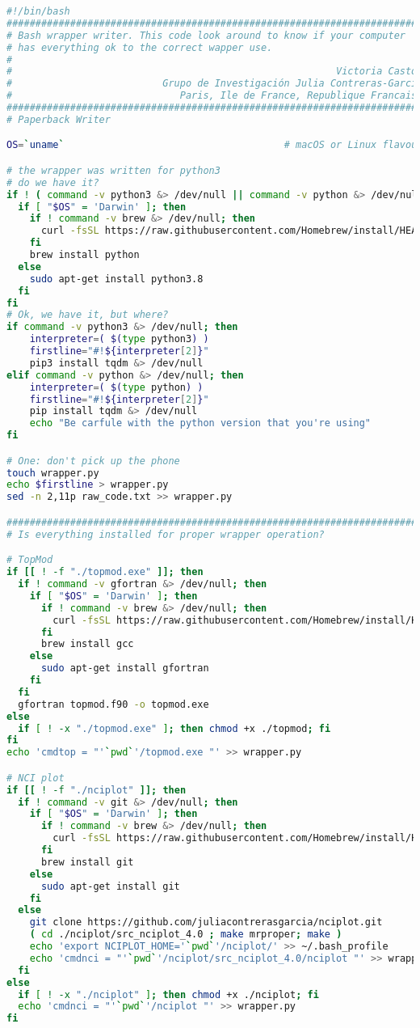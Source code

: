 \begin{lstlisting}[language=bash]
#!/bin/bash
########################################################################
# Bash wrapper writer. This code look around to know if your computer
# has everything ok to the correct wapper use.
#
#                                                        Victoria Castor
#                          Grupo de Investigación Julia Contreras-García
#                             Paris, Ile de France, Republique Francaise
########################################################################
# Paperback Writer

OS=`uname`                                      # macOS or Linux flavour

# the wrapper was written for python3
# do we have it?
if ! ( command -v python3 &> /dev/null || command -v python &> /dev/null ); then
  if [ "$OS" = 'Darwin' ]; then
    if ! command -v brew &> /dev/null; then
      curl -fsSL https://raw.githubusercontent.com/Homebrew/install/HEAD/install.sh
    fi
    brew install python
  else
    sudo apt-get install python3.8
  fi
fi
# Ok, we have it, but where?
if command -v python3 &> /dev/null; then
    interpreter=( $(type python3) )
    firstline="#!${interpreter[2]}"
    pip3 install tqdm &> /dev/null
elif command -v python &> /dev/null; then
    interpreter=( $(type python) )
    firstline="#!${interpreter[2]}"
    pip install tqdm &> /dev/null
    echo "Be carfule with the python version that you're using"
fi

# One: don't pick up the phone
touch wrapper.py
echo $firstline > wrapper.py
sed -n 2,11p raw_code.txt >> wrapper.py

########################################################################
# Is everything installed for proper wrapper operation?

# TopMod
if [[ ! -f "./topmod.exe" ]]; then
  if ! command -v gfortran &> /dev/null; then
    if [ "$OS" = 'Darwin' ]; then
      if ! command -v brew &> /dev/null; then
        curl -fsSL https://raw.githubusercontent.com/Homebrew/install/HEAD/install.sh
      fi
      brew install gcc
    else
      sudo apt-get install gfortran
    fi
  fi
  gfortran topmod.f90 -o topmod.exe
else
  if [ ! -x "./topmod.exe" ]; then chmod +x ./topmod; fi
fi
echo 'cmdtop = "'`pwd`'/topmod.exe "' >> wrapper.py

# NCI plot
if [[ ! -f "./nciplot" ]]; then
  if ! command -v git &> /dev/null; then
    if [ "$OS" = 'Darwin' ]; then
      if ! command -v brew &> /dev/null; then
        curl -fsSL https://raw.githubusercontent.com/Homebrew/install/HEAD/install.sh
      fi
      brew install git
    else
      sudo apt-get install git
    fi
  else
    git clone https://github.com/juliacontrerasgarcia/nciplot.git
    ( cd ./nciplot/src_nciplot_4.0 ; make mrproper; make )
    echo 'export NCIPLOT_HOME='`pwd`'/nciplot/' >> ~/.bash_profile
    echo 'cmdnci = "'`pwd`'/nciplot/src_nciplot_4.0/nciplot "' >> wrapper.py
  fi
else
  if [ ! -x "./nciplot" ]; then chmod +x ./nciplot; fi
  echo 'cmdnci = "'`pwd`'/nciplot "' >> wrapper.py
fi


\end{lstlisting}

